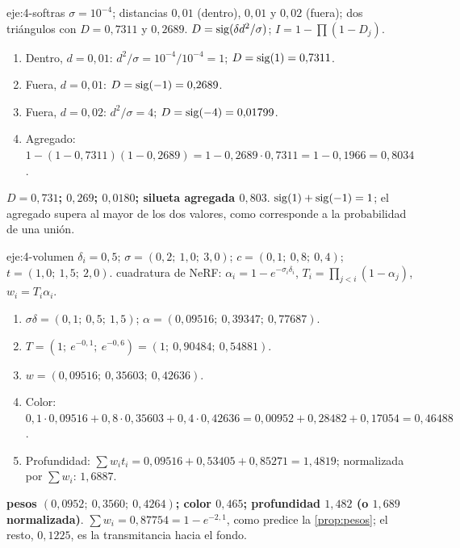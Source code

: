 \begin{solucion}{eje:4-softras}
\datos $\sigma=10^{-4}$; distancias $0{,}01$ (dentro), $0{,}01$ y $0{,}02$ (fuera); dos triángulos con $D=0{,}7311$ y $0{,}2689$.
\planteamiento $D=\operatorname{sig}(\delta d^2/\sigma)$; $I=1-\prod(1-D_j)$.
\pasos
\begin{enumerate}[label=\arabic*.]
  \item Dentro, $d=0{,}01$: $d^2/\sigma=10^{-4}/10^{-4}=1$; $D=\operatorname{sig}(1)=0{,}7311$.
  \item Fuera, $d=0{,}01$: $D=\operatorname{sig}(-1)=0{,}2689$.
  \item Fuera, $d=0{,}02$: $d^2/\sigma=4$; $D=\operatorname{sig}(-4)=0{,}01799$.
  \item Agregado: $1-(1-0{,}7311)(1-0{,}2689)=1-0{,}2689\cdot 0{,}7311=1-0{,}1966=0{,}8034$.
\end{enumerate}
\resultado \textbf{$D=0{,}731$; $0{,}269$; $0{,}0180$; silueta agregada $0{,}803$}.
\comprobacion $\operatorname{sig}(1)+\operatorname{sig}(-1)=1$; el agregado supera al mayor de los dos valores, como corresponde a la probabilidad de una unión.
\end{solucion}

\begin{solucion}{eje:4-volumen}
\datos $\delta_i=0{,}5$; $\sigma=(0{,}2;\ 1{,}0;\ 3{,}0)$; $c=(0{,}1;\ 0{,}8;\ 0{,}4)$; $t=(1{,}0;\ 1{,}5;\ 2{,}0)$.
\planteamiento cuadratura de NeRF: $\alpha_i=1-e^{-\sigma_i\delta_i}$, $T_i=\prod_{j<i}(1-\alpha_j)$, $w_i=T_i\alpha_i$.
\pasos
\begin{enumerate}[label=\arabic*.]
  \item $\sigma\delta=(0{,}1;\ 0{,}5;\ 1{,}5)$; $\alpha=(0{,}09516;\ 0{,}39347;\ 0{,}77687)$.
  \item $T=(1;\ e^{-0{,}1};\ e^{-0{,}6})=(1;\ 0{,}90484;\ 0{,}54881)$.
  \item $w=(0{,}09516;\ 0{,}35603;\ 0{,}42636)$.
  \item Color: $0{,}1\cdot 0{,}09516+0{,}8\cdot 0{,}35603+0{,}4\cdot 0{,}42636=0{,}00952+0{,}28482+0{,}17054=0{,}46488$.
  \item Profundidad: $\sum w_it_i=0{,}09516+0{,}53405+0{,}85271=1{,}4819$; normalizada por $\sum w_i$: $1{,}6887$.
\end{enumerate}
\resultado \textbf{pesos $(0{,}0952;\ 0{,}3560;\ 0{,}4264)$; color $0{,}465$; profundidad $1{,}482$ (o $1{,}689$ normalizada)}.
\comprobacion $\sum w_i=0{,}87754=1-e^{-2{,}1}$, como predice la \cref{prop:pesos}; el resto, $0{,}1225$, es la transmitancia hacia el fondo.
\end{solucion}

